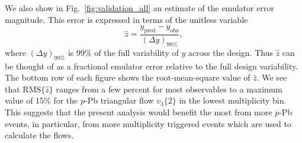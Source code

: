 \documentclass[aps,prc,reprint,amsmath,nofootinbib]{revtex4-1}
\begin{document}
We also show in Fig.~\ref{fig:validation_all} an estimate of the emulator error magnitude.
This error is expressed in terms of the unitless variable
\begin{equation}
  \hat{z} = \frac{y_\text{pred} - y_\text{obs}}{(\Delta y)_{99\%}},
\end{equation}
where $(\Delta y)_{99\%}$ is 99\% of the full variability of $y$ across the design.
Thus $\hat{z}$ can be thought of as a fractional emulator error relative to the full design variability.
The bottom row of each figure shows the root-mean-square value of $\hat{z}$.
We see that $\text{RMS}\{\hat{z}\}$ ranges from a few percent for most observables to a maximum value of 15\% for the $p$-Pb triangular flow $v_3\{2\}$ in the lowest multiplicity bin.
This suggests that the present analysis would benefit the most from more $p$-Pb events, in particular, from more multiplicity triggered events which are used to calculate the flows.
\end{document}
